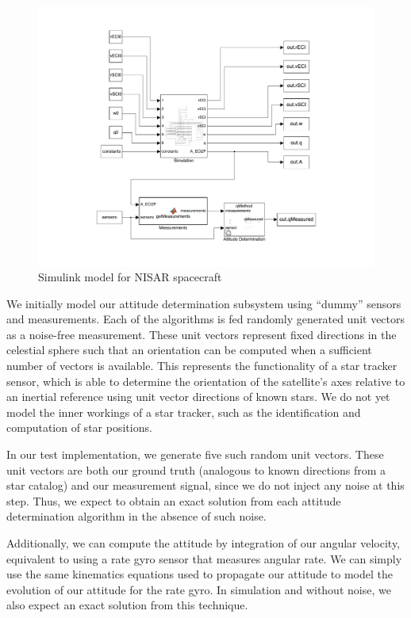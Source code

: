 \begin{figure}[H]
\centering
\includegraphics[scale=0.55]{Images/ps6_problem4.pdf}
\caption{Simulink model for NISAR spacecraft}
\label{fig:Images/ps6_problem4}
\end{figure}

We initially model our attitude determination subsystem using ``dummy'' sensors and measurements. Each of the algorithms is fed randomly generated unit vectors as a noise-free measurement. These unit vectors represent fixed directions in the celestial sphere such that an orientation can be computed when a sufficient number of vectors is available. This represents the functionality of a star tracker sensor, which is able to determine the orientation of the satellite's axes relative to an inertial reference using unit vector directions of known stars. We do not yet model the inner workings of a star tracker, such as the identification and computation of star positions.

In our test implementation, we generate five such random unit vectors. These unit vectors are both our ground truth (analogous to known directions from a star catalog) and our measurement signal, since we do not inject any noise at this step. Thus, we expect to obtain an exact solution from each attitude determination algorithm in the absence of such noise.

Additionally, we can compute the attitude by integration of our angular velocity, equivalent to using a rate gyro sensor that measures angular rate. We can simply use the same kinematics equations used to propagate our attitude to model the evolution of our attitude for the rate gyro. In simulation and without noise, we also expect an exact solution from this technique.

